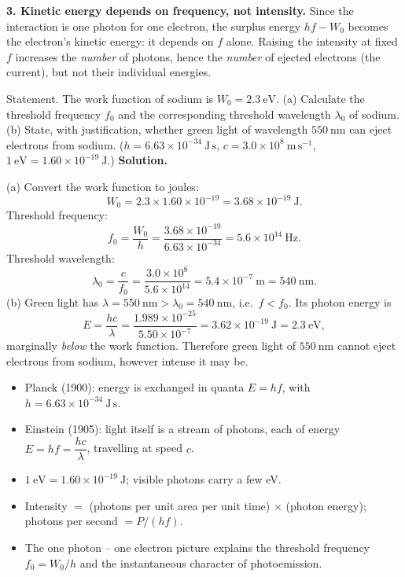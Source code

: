 \documentclass[11pt]{article}
\begin{document}
\textbf{3. Kinetic energy depends on frequency, not intensity.} Since the interaction is one photon for one electron, the surplus energy $hf - W_0$ becomes the electron's kinetic energy: it depends on $f$ alone. Raising the intensity at fixed $f$ increases the \emph{number} of photons, hence the \emph{number} of ejected electrons (the current), but not their individual energies.

\begin{exoresolu}
Statement. The work function of sodium is $W_0 = 2.3\ \mathrm{eV}$. (a) Calculate the threshold frequency $f_0$ and the corresponding threshold wavelength $\lambda_0$ of sodium. (b) State, with justification, whether green light of wavelength $550\ \mathrm{nm}$ can eject electrons from sodium. ($h = 6.63 \times 10^{-34}\ \mathrm{J\,s}$, $c = 3.0 \times 10^{8}\ \mathrm{m\,s^{-1}}$, $1\ \mathrm{eV} = 1.60 \times 10^{-19}\ \mathrm{J}$.)
\tcblower
\textbf{Solution.}\par
(a) Convert the work function to joules:
\[ W_0 = 2.3 \times 1.60 \times 10^{-19} = 3.68 \times 10^{-19}\ \mathrm{J}. \]
Threshold frequency:
\[ f_0 = \frac{W_0}{h} = \frac{3.68 \times 10^{-19}}{6.63 \times 10^{-34}} = 5.6 \times 10^{14}\ \mathrm{Hz}. \]
Threshold wavelength:
\[ \lambda_0 = \frac{c}{f_0} = \frac{3.0 \times 10^{8}}{5.6 \times 10^{14}} = 5.4 \times 10^{-7}\ \mathrm{m} = 540\ \mathrm{nm}. \]
(b) Green light has $\lambda = 550\ \mathrm{nm} > \lambda_0 = 540\ \mathrm{nm}$, i.e.\ $f < f_0$. Its photon energy is
\[ E = \frac{hc}{\lambda} = \frac{1.989 \times 10^{-25}}{5.50 \times 10^{-7}} = 3.62 \times 10^{-19}\ \mathrm{J} = 2.3\ \mathrm{eV}, \]
marginally \emph{below} the work function. Therefore green light of $550\ \mathrm{nm}$ cannot eject electrons from sodium, however intense it may be.
\end{exoresolu}

\begin{aretenir}
\begin{itemize}
\item Planck (1900): energy is exchanged in quanta $E = hf$, with $h = 6.63 \times 10^{-34}\ \mathrm{J\,s}$.
\item Einstein (1905): light itself is a stream of photons, each of energy $E = hf = \dfrac{hc}{\lambda}$, travelling at speed $c$.
\item $1\ \mathrm{eV} = 1.60 \times 10^{-19}\ \mathrm{J}$; visible photons carry a few eV.
\item Intensity $=$ (photons per unit area per unit time) $\times$ (photon energy); photons per second $= P/(hf)$.
\item The one photon -- one electron picture explains the threshold frequency $f_0 = W_0/h$ and the instantaneous character of photoemission.
\end{itemize}
\end{aretenir}
\end{document}
